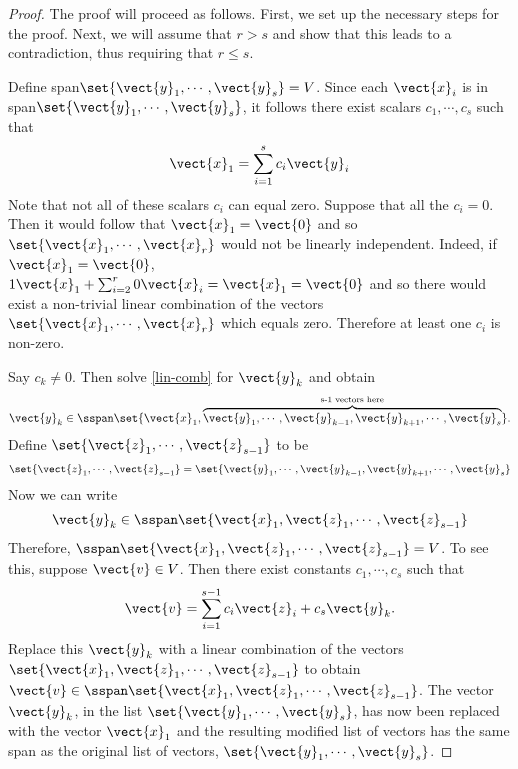 \begin{proof} The proof will proceed as follows. First, we set up the necessary steps for the proof. Next, we will assume that $r > s$ and show that this leads to a contradiction, thus requiring that $r \leq s$. 

Define span$\set{\vect{y}_{1},\cdots ,\vect{y}_{s}} = V$. Since each $\vect{x}_i$ is in  span$\set{\vect{y}_{1},\cdots ,\vect{y}_{s}}$, it follows there exist scalars $c_{1},\cdots ,c_{s}$
such that 
\begin{equation}
\vect{x}_{1}=\sum_{i=1}^{s}c_{i}\vect{y}_{i}  \label{lin-comb}
\end{equation}
Note that not all of these scalars $c_i$ can equal zero. Suppose that all the $c_i=0$. Then it
would follow that $\vect{x}_{1}=\vect{0}$ and so $\set{\vect{x}
_{1},\cdots ,\vect{x}_{r}} $ would not be linearly independent.
Indeed, if $\vect{x}_{1}=\vect{0}$, $1\vect{x}_{1}+\sum_{i=2}^{r}0
\vect{x}_{i}=\vect{x}_{1}=\vect{0}$ and so there would exist a
non-trivial linear combination of the vectors $\set{\vect{x}_{1},\cdots ,
\vect{x}_{r}} $ which equals zero. Therefore at least one $c_i$ is non-zero. 

Say $c_{k}\neq 0$. Then solve {\eqref{lin-comb}} for $\vect{y}_{k}$ and obtain 
\begin{equation*}
\vect{y}_{k}\in \sspan\set{\vect{x}_{1},\overset{\text{s-1
vectors here}}{\overbrace{\vect{y}_{1},\cdots ,\vect{y}_{k-1},\vect{y}
_{k+1},\cdots ,\vect{y}_{s}}}} .
\end{equation*}
Define $\set{\vect{z}_{1},\cdots ,\vect{z}_{s-1}} $ to be
\begin{equation*}
\set{\vect{z}_{1},\cdots ,\vect{z}_{s-1}} = \set{
\vect{y}_{1},\cdots ,\vect{y}_{k-1},\vect{y}_{k+1},\cdots ,\vect{y}
_{s}}
\end{equation*}
Now we can write 
\begin{equation*}
\vect{y}_{k}\in \sspan\set{\vect{x}_{1}, \vect{z}_{1},\cdots, \vect{z}_{s-1}} 
\end{equation*}
Therefore, $\sspan\set{\vect{x}_{1},\vect{z}_{1},\cdots ,\vect{z
}_{s-1}}=V$. To see this, suppose $\vect{v}\in V$. Then there exist constants $
c_{1},\cdots ,c_{s}$ such that 
\begin{equation*}
\vect{v}=\sum_{i=1}^{s-1}c_{i}\vect{z}_{i}+c_{s}\vect{y}_{k}.
\end{equation*}
Replace this $\vect{y}_{k}$ with a linear combination of the
vectors $\set{\vect{x}_{1},\vect{z}_{1},\cdots ,\vect{z}_{s-1}}$
to obtain $\vect{v}\in \sspan\set{\vect{x}_{1},\vect{z}
_{1},\cdots ,\vect{z}_{s-1}}$. The vector $\vect{y}_{k}$, in the
list $\set{\vect{y}_{1},\cdots ,\vect{y}_{s}}$, has now been
replaced with the vector $\vect{x}_{1}$ and the resulting modified list of
vectors has the same span as the original list of vectors, $\set{\vect{y
}_{1},\cdots ,\vect{y}_{s}}$.


\end{proof}
